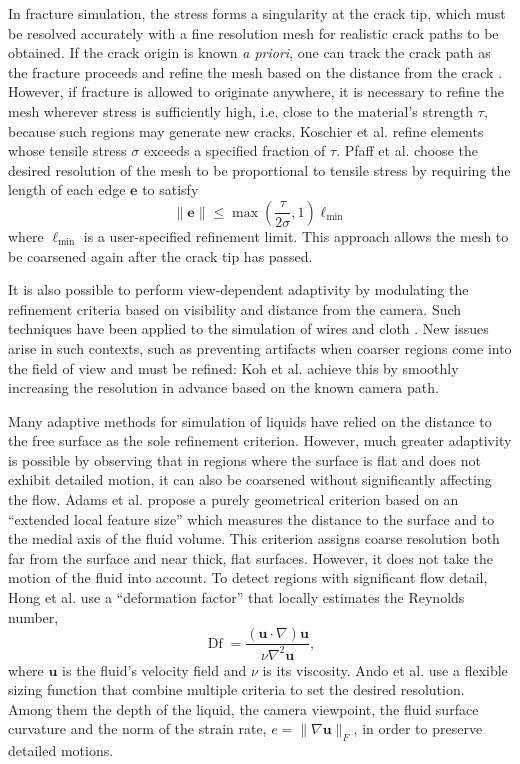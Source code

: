 In fracture simulation, the stress forms a singularity at the crack tip, which must be resolved accurately with a fine resolution mesh for realistic crack paths to be obtained.
If the crack origin is known \textit{a priori}, one can track the crack path as the fracture proceeds and refine the mesh based on the distance from the crack \cite{Busaryev2013}.
However, if fracture is allowed to originate anywhere, it is necessary to refine the mesh wherever stress is sufficiently high, i.e. close to the material's strength $\tau$, because such regions may generate new cracks.
Koschier et al. \cite{Koschier2014} refine elements whose tensile stress $\sigma$ exceeds a specified fraction of $\tau$.
Pfaff et al. \cite{Pfaff2014} choose the desired resolution of the mesh to be proportional to tensile stress by requiring the length of each edge $\mathbf e$ to satisfy
\begin{equation}
	\|\mathbf e\|\le\max\left(\frac{\tau}{2\sigma},1\right)\ell_{\min}
\end{equation}
where $\ell_{\min}$ is a user-specified refinement limit.
This approach allows the mesh to be coarsened again after the crack tip has passed.

It is also possible to perform view-dependent adaptivity by modulating the refinement criteria based on visibility and distance from the camera. Such techniques have been applied to the simulation of wires \cite{Servin2008} and cloth \cite{Koh2014}. New issues arise in such contexts, such as preventing artifacts when coarser regions come into the field of view and must be refined: Koh et al. \cite{Koh2014} achieve this by smoothly increasing the resolution in advance based on the known camera path.

Many adaptive methods for simulation of liquids have relied on the distance to the free surface as the sole refinement criterion.
However, much greater adaptivity is possible by observing that in regions where the surface is flat and does not exhibit detailed motion, it can also be coarsened without significantly affecting the flow.
Adams et al. \cite{Adams2007} propose a purely geometrical criterion based on an ``extended local feature size'' which measures the distance to the surface and to the medial axis of the fluid volume.
This criterion assigns coarse resolution both far from the surface and near thick, flat surfaces.
However, it does not take the motion of the fluid into account.
To detect regions with significant flow detail, Hong et al. \cite{Hong2008FLIP} use a ``deformation factor'' that locally estimates the Reynolds number,
\begin{equation}
  \operatorname{Df} = \frac{(\mathbf u\cdot\nabla)\mathbf u}{\nu\nabla^2\mathbf u},
\end{equation}
where $\mathbf u$ is the fluid's velocity field and $\nu$ is its viscosity.
Ando et al. \cite{Ando2013} use a flexible sizing function that combine multiple criteria to set the desired resolution. Among them the depth of the liquid, the camera viewpoint, the fluid surface curvature and the norm of the strain rate, $e = \|\nabla\mathbf u\|_F$, in order to preserve detailed motions.


